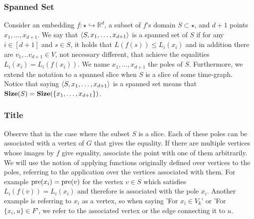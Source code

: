 \documentclass{beamer}
\begin{document}
\begin{frame}
  \frametitle{Spanned Set} 

    Consider an embedding $f : \star \hookrightarrow \mathbb{R}^{d}$, a subset of $f$'s domain $S \subset \star$, and $d+1$ points $x_{1}, \ldots, x_{d+1}$. We say that $\braket{S, x_{1}, \ldots, x_{d+1}}$ is a spanned set of $S$ if for any $i \in [d+1]$ and $s \in S$, it holds that $L(f(s)) \le L_{i}(x_{i})$ and in addition there are $v_{1},..v_{d+1} \in V$, not necessary different, that achieve the equalities $L_{i}(x_{i}) = L_{i}(f(x_{i}))$.  We name $x_{1}, \ldots, x_{d+1}$ the poles of $S$. Furthermore, we extend the notation to a spanned slice when $S$ is a slice of some time-graph. Notice that saying $\braket{S, x_{1}, \ldots, x_{d+1}}$ is a spanned set means that $\mathbf{Size}(S) = \mathbf{Size}( \{x_{1}, \ldots, x_{d+1}\})$.
\end{frame}



\begin{frame}
  \frametitle{Title} 
  Observe that in the case where the subset $S$ is a slice. Each of these poles can be associated with a vertex of $G$ that gives the equality. If there are multiple vertices whose images by $f$ give equality, associate the point with one of them arbitrarily. We will use the notion of applying functions originally defined over vertices to the poles, referring to the application over the vertices associated with them. For example $\text{pre}(x_{i}) = \text{pre}(v)$ for the vertex $v \in S$ which satisfies $L_{i}(f(v)) = L_{i}(x_i)$ and therefore is associated with the pole $x_{i}$. 
 Another example is referring to $x_{i}$ as a vertex, so when saying 'For $x_{i} \in V_{k}$' or 'For $\{x_{i},u\} \in F$', we refer to the associated vertex or the edge connecting it to $u$.
\end{frame}
\end{document}
